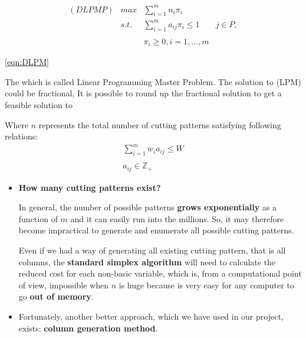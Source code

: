 \documentclass[10pt,a4paper]{article}
\begin{document}
\begin{equation}\label{eqn:DLPM}
\begin{array} {lllr} 
(DLPMP) & max & \displaystyle\sum_{i = 1}^{m} n_i\pi_i & \\
& s.t. & \displaystyle\sum_{i = 1}^{m} a_{ij}\pi_i \leq 1 & j \in P, \\\\
&& \pi_i \geq 0, i = 1,...,m &
\end{array}
\end{equation}

\ref{eqn:DLPM}


The 
which is called Linear Programming Master Problem. The solution to (LPM) could be fractional, It is possible to round up the fractional solution to get a feasible solution to 

\vspace{5mm}
Where $n$ represents the total number of cutting patterns satisfying following relations:
\begin{equation}
\begin{array} {c} 
\displaystyle\sum_{i=1}^m w_i a_{ij} \leq W \\\\ a_{ij} \in \mathbb{Z}_{+}
\end{array}
\end{equation}


\begin{itemize}
\item \textbf{How many cutting patterns exist?}

\vspace{5mm}
In general, the number of possible patterns \textbf{grows exponentially} as a function of $m$ and it can easily run into the millions. So, it may therefore become impractical to generate and enumerate all possible cutting patterns. 

\vspace{5mm}
Even if we had a way of generating all existing cutting pattern, that is all columns, the \textbf{standard simplex algorithm} will need to calculate the reduced cost for each non-basic variable, which is, from a computational point of view, impossible when $n$ is huge because is very easy for any computer to go \textbf{out of memory}.
\end{itemize}


\begin{itemize}
\item Fortunately, another better approach, which we have used in our project, exists: \textbf{column generation method}.
\end{itemize}
\end{document}
